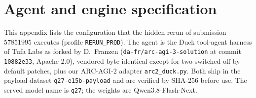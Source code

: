 \section{Agent and engine specification}\label{app:spec}
\sloppy\raggedright

This appendix lists the configuration that the hidden rerun of submission 57851995 executes (profile \texttt{RERUN\_PROD}). The agent is the Duck tool-agent harness of Tufa Labs as forked by D.~Franzen (\texttt{da-fr/arc-agi-3-solution} at commit \texttt{10882e33}, Apache-2.0), vendored byte-identical except for two switched-off-by-default patches, plus our ARC-AGI-2 adapter \texttt{arc2\_duck.py}. Both ship in the payload dataset \texttt{q27-e15b-payload} and are verified by SHA-256 before use. The served model name is \texttt{q27}; the weights are Qwen3.8-Flash-Next.

